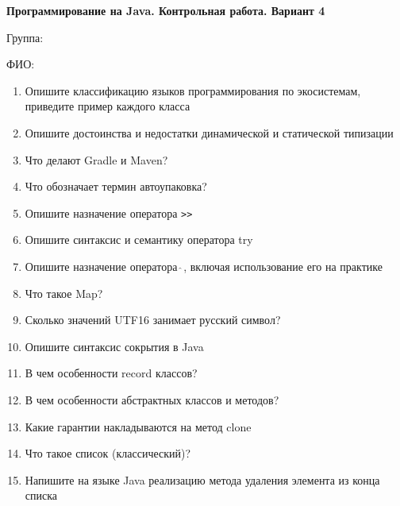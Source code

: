 \documentclass[12pt]{article}
\begin{document}
\newpage\begin{minipage}{\textwidth}
\textbf{Программирование на Java. Контрольная работа. Вариант 4}

Группа: \underline{\hspace{3cm}}

ФИО: \underline{\hspace{10cm}}

\begin{enumerate}
\item Опишите классификацию языков программирования по экосистемам, приведите пример каждого класса
\item Опишите достоинства и недостатки динамической и статической типизации
\item Что делают Gradle и Maven?
\item Что обозначает термин автоупаковка?
\item Опишите назначение оператора \verb|>>|
\item Опишите синтаксис и семантику оператора try
\item Опишите назначение оператора $\hat{\ }$, включая использование его на практике
\item Что такое Map?
\item Сколько значений UTF16 занимает русский символ?
\item Опишите синтаксис сокрытия в Java
\item В чем особенности record классов?
\item В чем особенности абстрактных классов и методов?
\item Какие гарантии накладываются на метод clone
\item Что такое список (классический)?
\item Напишите на языке Java реализацию метода удаления элемента из конца списка

\end{enumerate}
\end{minipage}
\end{document}
